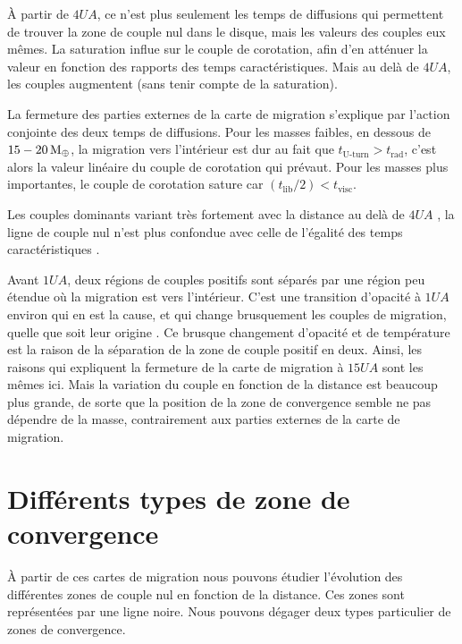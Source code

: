 À partir de $4\unit{UA}$, ce n'est plus seulement les temps de diffusions qui permettent de trouver la zone de couple nul dans le disque, mais les valeurs des couples eux mêmes. La saturation influe sur le couple de corotation, afin d'en atténuer la valeur en fonction des rapports des temps caractéristiques. Mais au delà de $4\unit{UA}$, les couples augmentent (sans tenir compte de la saturation). 

La fermeture des parties externes de la carte de migration s'explique par l'action conjointe des deux temps de diffusions. Pour les masses
faibles, en dessous de $15-20\mathrm{\thinspace M_\oplus}$, la migration vers l'intérieur est dur au fait que $t_\text{U-turn} > t_\text{rad}$, c'est
alors la valeur linéaire du couple de corotation qui prévaut. Pour les masses plus importantes, le couple de corotation sature
car $(t_\text{lib}/2) < t_\text{visc}$. 

Les couples dominants variant très fortement avec la distance au delà de $4\unit{UA}$ , la ligne de couple nul n'est plus confondue avec celle de l'égalité des temps caractéristiques .

Avant $1\unit{UA}$, deux régions de couples positifs sont séparés par une région peu étendue où la migration est vers l'intérieur. C'est une transition d'opacité à $1\unit{UA}$ environ qui
en est la cause, et qui change brusquement les couples de migration, quelle que soit leur origine . Ce
brusque changement d'opacité et de température est la raison de la séparation de la zone de couple positif en deux. Ainsi, les
raisons qui expliquent la fermeture de la carte de migration à $15\unit{UA}$ sont les mêmes ici. Mais la variation du couple en fonction de la distance est beaucoup plus
grande, de sorte que la position de la zone de convergence semble ne pas dépendre de la masse, contrairement aux parties
externes de la carte de migration.

\section{Différents types de zone de convergence}\label{sec:CZ-types}
À partir de ces cartes de migration nous pouvons étudier l'évolution des différentes zones de couple nul en fonction de la
distance. Ces zones sont représentées par une ligne noire. Nous pouvons dégager deux types particulier de zones de convergence. 

